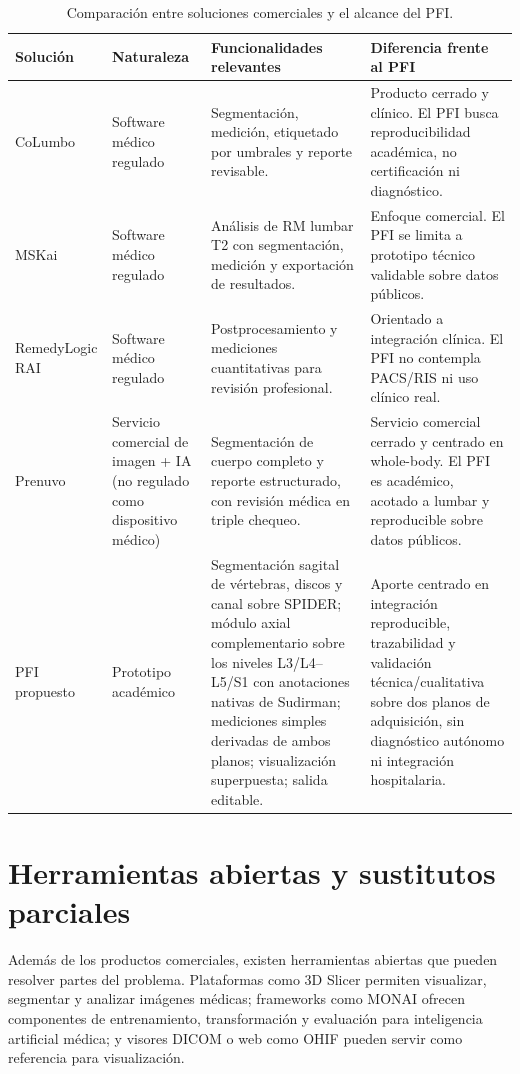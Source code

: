 \begin{table}[htbp]
\centering
\caption{Comparación entre soluciones comerciales y el alcance del PFI.}
\label{tab:comparacion_soluciones_comerciales}
\small
\begin{tabularx}{\textwidth}{p{} p{} X p{}}
\hline
\textbf{Solución} & \textbf{Naturaleza} & \textbf{Funcionalidades relevantes} & \textbf{Diferencia frente al PFI} \\
\hline
CoLumbo & Software médico regulado & Segmentación, medición, etiquetado por umbrales y reporte revisable. & Producto cerrado y clínico. El PFI busca reproducibilidad académica, no certificación ni diagnóstico. \\
MSKai & Software médico regulado & Análisis de RM lumbar T2 con segmentación, medición y exportación de resultados. & Enfoque comercial. El PFI se limita a prototipo técnico validable sobre datos públicos. \\
RemedyLogic RAI & Software médico regulado & Postprocesamiento y mediciones cuantitativas para revisión profesional. & Orientado a integración clínica. El PFI no contempla PACS/RIS ni uso clínico real. \\
Prenuvo & Servicio comercial de imagen + IA (no regulado como dispositivo médico) & Segmentación de cuerpo completo y reporte estructurado, con revisión médica en triple chequeo. & Servicio comercial cerrado y centrado en whole-body. El PFI es académico, acotado a lumbar y reproducible sobre datos públicos. \\
PFI propuesto & Prototipo académico & Segmentación sagital de vértebras, discos y canal sobre SPIDER; módulo axial complementario sobre los niveles L3/L4--L5/S1 con anotaciones nativas de Sudirman; mediciones simples derivadas de ambos planos; visualización superpuesta; salida editable. & Aporte centrado en integración reproducible, trazabilidad y validación técnica/cualitativa sobre dos planos de adquisición, sin diagnóstico autónomo ni integración hospitalaria. \\
\hline
\end{tabularx}
\end{table}

\section{Herramientas abiertas y sustitutos parciales}

Además de los productos comerciales, existen herramientas abiertas que pueden resolver partes del problema. Plataformas como 3D Slicer permiten visualizar, segmentar y analizar imágenes médicas; frameworks como MONAI ofrecen componentes de entrenamiento, transformación y evaluación para inteligencia artificial médica; y visores DICOM o web como OHIF pueden servir como referencia para visualización.

